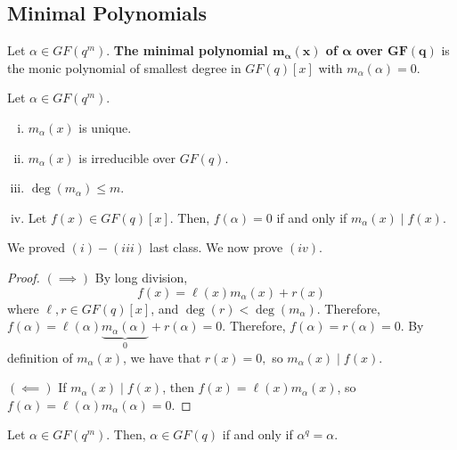 \subsection{Minimal Polynomials}
\begin{defbox}
    \begin{definition}
        Let $ \alpha\in GF(q^m) $. \textbf{The minimal polynomial
            $\bm{m_\alpha(x)} $ of $ \bm{\alpha} $ over $ \bm{GF(q)} $} is
        the monic polynomial of smallest degree in $ GF(q)[x] $ with
        $ m_\alpha(\alpha)=0 $.
    \end{definition}
\end{defbox}

\begin{thmbox}
    \begin{theorem}
        Let $ \alpha\in GF(q^m) $.
        \begin{enumerate}[(i)]
            \item $ m_\alpha(x) $ is unique.
            \item $ m_\alpha(x) $ is irreducible over $ GF(q) $.
            \item $ \deg(m_\alpha)\leqslant m $.
            \item Let $ f(x)\in GF(q)[x] $. Then, $ f(\alpha)=0 $ if and only
                  if $ m_\alpha(x)\mid f(x) $.
        \end{enumerate}
    \end{theorem}
\end{thmbox}
We proved $ (i)-(iii) $ last class. We now prove $ (iv) $.
\begin{proof}
    $ (\implies) $
    By long division,
    \[ f(x)=\ell(x)m_\alpha(x)+r(x) \]
    where $ \ell,r\in GF(q)[x] $, and $ \deg(r)<\deg(m_\alpha) $.
    Therefore, $ f(\alpha)=\ell(\alpha)\underbrace{m_\alpha(\alpha)}_{0}+r(\alpha)=0 $.
    Therefore, $ f(\alpha)=r(\alpha)=0 $. By definition of $ m_\alpha(x) $,
    we have that $ r(x)=0, $ so $ m_\alpha(x)\mid f(x) $.

    $ (\impliedby) $ If $ m_\alpha(x)\mid f(x) $, then $ f(x)=\ell(x)m_\alpha(x) $,
    so $ f(\alpha)=\ell(\alpha)m_\alpha(\alpha)=0 $.
\end{proof}

\begin{thmbox}
    \begin{theorem}
        Let $ \alpha\in GF(q^m) $. Then, $ \alpha\in GF(q) $ if and only if
        $ \alpha^q=\alpha $.
    \end{theorem}
\end{thmbox}

